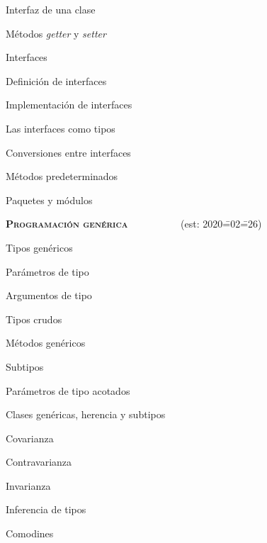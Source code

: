\begin{longenum}
\begin{longenum}
\begin{longenum}
            \item Interfaz de una clase
            \item Métodos \textit{getter} y \textit{setter}
        \end{longenum}
        \item Interfaces
        \begin{longenum}
            \item Definición de interfaces
            \item Implementación de interfaces
            \item Las interfaces como tipos
            \item Conversiones entre interfaces
            \item Métodos predeterminados
        \end{longenum}
        \item Paquetes y módulos
    \end{longenum}
    \item \textbf{\textsc{Programación genérica}} \ \ \ \ \ \ \ \ \ \ (est: 2020\==02\==26)
    \begin{longenum}
        \item Tipos genéricos
        \begin{longenum}
            \item Parámetros de tipo
            \item Argumentos de tipo
            \item Tipos crudos
        \end{longenum}
        \item Métodos genéricos
        \item Subtipos
        \begin{longenum}
            \item Parámetros de tipo acotados
            \item Clases genéricas, herencia y subtipos
            \begin{longenum}
                \item Covarianza
                \item Contravarianza
                \item Invarianza
            \end{longenum}
        \end{longenum}
        \item Inferencia de tipos
        \item Comodines

\end{longenum}
\end{longenum}
